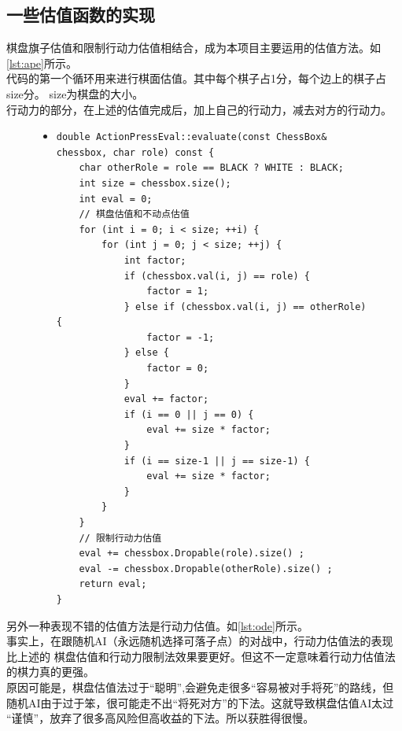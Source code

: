 \documentclass[a4paper]{article}
\begin{document}
\subsection{一些估值函数的实现}
棋盘旗子估值和限制行动力估值相结合，成为本项目主要运用的估值方法。如\autoref{lst:ape}所示。\\

代码的第一个循环用来进行棋面估值。其中每个棋子占1分，每个边上的棋子占size分。
size为棋盘的大小。\\

行动力的部分，在上述的估值完成后，加上自己的行动力，减去对方的行动力。\\
\begin{figure}[!hbt]
\begin{itemize}
\item[] \begin{lstlisting}[style=mycpp, label=lst:ape, caption=限制行动力和不动点估值算法]
double ActionPressEval::evaluate(const ChessBox& chessbox, char role) const {
    char otherRole = role == BLACK ? WHITE : BLACK;
    int size = chessbox.size();
    int eval = 0;
    // 棋盘估值和不动点估值
    for (int i = 0; i < size; ++i) {
        for (int j = 0; j < size; ++j) {
            int factor;
            if (chessbox.val(i, j) == role) {
                factor = 1;
            } else if (chessbox.val(i, j) == otherRole) {
                factor = -1;
            } else {
                factor = 0;
            } 
            eval += factor;
            if (i == 0 || j == 0) {
                eval += size * factor;
            }
            if (i == size-1 || j == size-1) {
                eval += size * factor;
            }
        }
    }
    // 限制行动力估值
    eval += chessbox.Dropable(role).size() ;
    eval -= chessbox.Dropable(otherRole).size() ;
    return eval;
}
\end{lstlisting}
\end{itemize}
\end{figure}

另外一种表现不错的估值方法是行动力估值。如\autoref{lst:ode}所示。\\

事实上，在跟随机AI（永远随机选择可落子点）的对战中，行动力估值法的表现比上述的
棋盘估值和行动力限制法效果要更好。但这不一定意味着行动力估值法的棋力真的更强。\\

原因可能是，棋盘估值法过于``聪明'',会避免走很多``容易被对手将死''的路线，但
随机AI由于过于笨，很可能走不出``将死对方''的下法。这就导致棋盘估值AI太过
``谨慎''，放弃了很多高风险但高收益的下法。所以获胜得很慢。\\
\end{document}
